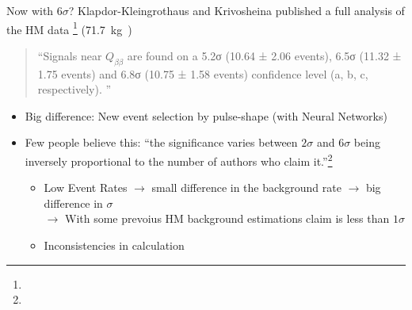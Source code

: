 \begin{frame}{Now with $6\sigma$?}
	Klapdor-Kleingrothaus and Krivosheina published a full analysis of the HM data \footnote{} (\SI{71.7}{\kilo\gram\year})
	\begin{quote}
		\enquote{Signals near $Q_{ββ}$ are found on a 5.2σ (10.64 ± 2.06 events), 6.5σ (11.32 ±
			1.75 events) and 6.8σ (10.75 ± 1.58 events) confidence level (a, b, c, respectively).
		}
	\end{quote}
	\vspace{-1em}
	\begin{itemize}
		\item Big difference: New event selection by pulse-shape (with Neural Networks)
		\item Few people believe this: \enquote{the significance varies between $2\sigma$ and $6\sigma$ being inversely proportional to the number of authors who claim it.}\footnote{}
			\begin{itemize}
			\item Low Event Rates $\rightarrow$ small difference in the background rate $\rightarrow$ big difference in $\sigma$\\
		            $\rightarrow$ With some prevoius HM background estimations claim is less than $1\sigma$
					\item Inconsistencies in calculation
	      \end{itemize}
	\end{itemize}
\end{frame}
